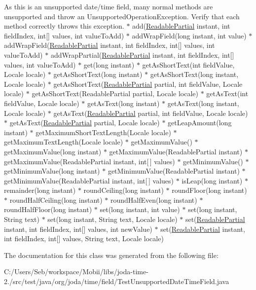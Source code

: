 As this is an unsupported date/time field, many normal methods are unsupported and throw an Unsupported\-Operation\-Exception. Verify that each method correctly throws this exception. $\ast$ add(\hyperlink{interfaceorg_1_1joda_1_1time_1_1_readable_partial}{Readable\-Partial} instant, int field\-Index, int\mbox{[}\mbox{]} values, int value\-To\-Add) $\ast$ add\-Wrap\-Field(long instant, int value) $\ast$ add\-Wrap\-Field(\hyperlink{interfaceorg_1_1joda_1_1time_1_1_readable_partial}{Readable\-Partial} instant, int field\-Index, int\mbox{[}\mbox{]} values, int value\-To\-Add) $\ast$ add\-Wrap\-Partial(\hyperlink{interfaceorg_1_1joda_1_1time_1_1_readable_partial}{Readable\-Partial} instant, int field\-Index, int\mbox{[}\mbox{]} values, int value\-To\-Add) $\ast$ get(long instant) $\ast$ get\-As\-Short\-Text(int field\-Value, Locale locale) $\ast$ get\-As\-Short\-Text(long instant) $\ast$ get\-As\-Short\-Text(long instant, Locale locale) $\ast$ get\-As\-Short\-Text(\hyperlink{interfaceorg_1_1joda_1_1time_1_1_readable_partial}{Readable\-Partial} partial, int field\-Value, Locale locale) $\ast$ get\-As\-Short\-Text(\-Readable\-Partial partial, Locale locale) $\ast$ get\-As\-Text(int field\-Value, Locale locale) $\ast$ get\-As\-Text(long instant) $\ast$ get\-As\-Text(long instant, Locale locale) $\ast$ get\-As\-Text(\hyperlink{interfaceorg_1_1joda_1_1time_1_1_readable_partial}{Readable\-Partial} partial, int field\-Value, Locale locale) $\ast$ get\-As\-Text(\hyperlink{interfaceorg_1_1joda_1_1time_1_1_readable_partial}{Readable\-Partial} partial, Locale locale) $\ast$ get\-Leap\-Amount(long instant) $\ast$ get\-Maximum\-Short\-Text\-Length(\-Locale locale) $\ast$ get\-Maximum\-Text\-Length(Locale locale) $\ast$ get\-Maximum\-Value() $\ast$ get\-Maximum\-Value(long instant) $\ast$ get\-Maximum\-Value(\-Readable\-Partial instant) $\ast$ get\-Maximum\-Value(\-Readable\-Partial instant, int\mbox{[}$\,$\mbox{]} values) $\ast$ get\-Minimum\-Value() $\ast$ get\-Minimum\-Value(long instant) $\ast$ get\-Minimum\-Value(\-Readable\-Partial instant) $\ast$ get\-Minimum\-Value(\-Readable\-Partial instant, int\mbox{[}$\,$\mbox{]} values) $\ast$ is\-Leap(long instant) $\ast$ remainder(long instant) $\ast$ round\-Ceiling(long instant) $\ast$ round\-Floor(long instant) $\ast$ round\-Half\-Ceiling(long instant) $\ast$ round\-Half\-Even(long instant) $\ast$ round\-Half\-Floor(long instant) $\ast$ set(long instant, int value) $\ast$ set(long instant, String text) $\ast$ set(long instant, String text, Locale locale) $\ast$ set(\hyperlink{interfaceorg_1_1joda_1_1time_1_1_readable_partial}{Readable\-Partial} instant, int field\-Index, int\mbox{[}\mbox{]} values, int new\-Value) $\ast$ set(\hyperlink{interfaceorg_1_1joda_1_1time_1_1_readable_partial}{Readable\-Partial} instant, int field\-Index, int\mbox{[}\mbox{]} values, String text, Locale locale) 

The documentation for this class was generated from the following file\-:\begin{DoxyCompactItemize}
\item 
C\-:/\-Users/\-Seb/workspace/\-Mobii/libs/joda-\/time-\/2./src/test/java/org/joda/time/field/Test\-Unsupported\-Date\-Time\-Field.\-java\end{DoxyCompactItemize}
